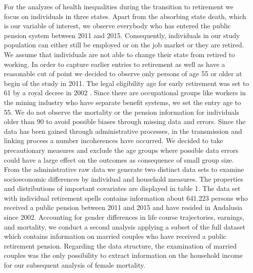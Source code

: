 \documentclass[a4paper,10pt,oneside,english]{article}
\begin{document}
For the analyzes of health inequalities during the transition to retirement we focus on individuals in three states. Apart from the absorbing state death, which is our variable of interest, we observe everybody who has entered the public pension system between 2011 and 2015. Consequently, individuals in our study population can either still be employed or on the job market or they are retired. We assume that individuals are not able to change their state from retired to working. In order to capture earlier entries to retirement as well as have a reasonable cut of point we decided to observe only persons of age 55 or older at begin of the study in 2011. The legal eligibility age for early retirement was set to 61 by a royal decree in 2002 \citep{RN217}. Since there are occupational groups like workers in the mining industry who have separate benefit systems, we set the entry age to 55. We do not observe the mortality or the pension information for individuals older than 90 to avoid possible biases through missing data and errors. Since the data has been gained through administrative processes, in the transmission and linking process a number incoherences have occurred. We decided to take precautionary measures and exclude the age groups where possible data errors could have a large effect on the outcomes as consequence of small group size.\\
From the administrative raw data we generate two distinct data sets to examine socioeconomic differences by individual and household measures. The properties and distributions of important covariates are displayed in table 1. The data set with individual retirement spells contains information about 641.223 persons who received a public pension between 2011 and 2015 and have resided in Andalusia since 2002. Accounting for gender differences in life course trajectories, earnings, and mortality, we conduct a second analysis applying a subset of the full dataset which contains information on married couples who have received a public retirement pension. Regarding the data structure, the examination of married couples was the only possibility to extract information on the household income for our subsequent analysis of female mortality.
\end{document}
